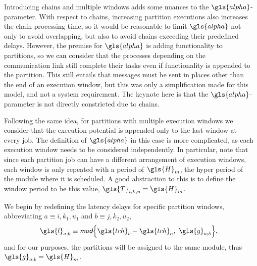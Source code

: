 \documentclass[main.tex]{subfiles}
\begin{document}
Introducing chains and multiple windows adds some nuances to the $\gls{alpha}$-parameter.
With respect to chains, increasing partition executions also increases the chain processing time, so it would be reasonable to limit $\gls{alpha}$ not only to avoid overlapping, but also to avoid chains exceeding their predefined delays.
However, the premise for $\gls{alpha}$ is adding functionality to partitions, so we can consider that the processes depending on the communication link still complete their tasks even if functionality is appended to the partition.
This still entails that messages must be sent in places other than the end of an execution window, but this was only a simplification made for this model, and not a system requirement.
The keynote here is that the $\gls{alpha}$-parameter is not directly constricted due to chains.

Following the same idea, for partitions with multiple execution windows we consider that the execution potential is appended only to the last window at every job.
The definition of $\gls{alpha}$ in this case is more complicated, as each execution window needs to be considered independently.
In particular, note that since each partition job can have a different arrangement of execution windows, each window is only repeated with a period of $\gls{H}_m$, the hyper period of the module where it is scheduled.
A good abstraction to this is to define the window period to be this value, $\gls{T}_{i,k,u}=\gls{H}_m$.

We begin by redefining the latency delays for specific partition windows, abbreviating $a\equiv i,k_1,u_1$ and $b\equiv j,k_2,u_2$,
\begin{align}
    \gls{l}_{a;b}\equiv\mod\braces*{\gls{tch}_{b}-\gls{tch}_{a},\ \gls{g}_{a;b}},
\end{align}
and for our purposes, the partitions will be assigned to the same module, thus $\gls{g}_{a;b}=\gls{H}_m$.

\end{document}
